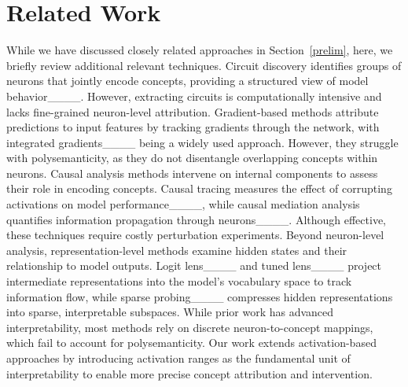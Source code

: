 \section{Related Work}
While we have discussed closely related approaches in Section~\ref{prelim}, here, we briefly review additional relevant techniques.
Circuit discovery identifies groups of neurons that jointly encode concepts, providing a structured view of model behavior____. However, extracting circuits is computationally intensive and lacks fine-grained neuron-level attribution.
Gradient-based methods attribute predictions to input features by tracking gradients through the network, with integrated gradients____ being a widely used approach. However, they struggle with polysemanticity, as they do not disentangle overlapping concepts within neurons.
Causal analysis methods intervene on internal components to assess their role in encoding concepts. Causal tracing measures the effect of corrupting activations on model performance____, while causal mediation analysis quantifies information propagation through neurons____. Although effective, these techniques require costly perturbation experiments.
Beyond neuron-level analysis, representation-level methods examine hidden states and their relationship to model outputs. Logit lens____ and tuned lens____ project intermediate representations into the model’s vocabulary space to track information flow, while sparse probing____ compresses hidden representations into sparse, interpretable subspaces.
While prior work has advanced interpretability, most methods rely on discrete neuron-to-concept mappings, which fail to account for polysemanticity. Our work extends activation-based approaches by introducing activation ranges as the fundamental unit of interpretability to enable more precise concept attribution and intervention.





